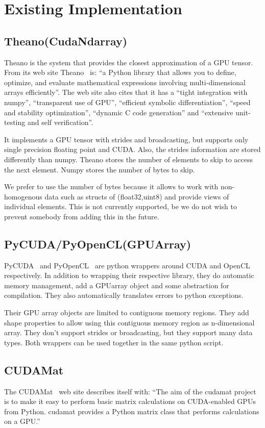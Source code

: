 \documentclass{article} %
\begin{document}
\section{Existing Implementation}
\subsection{Theano(CudaNdarray)}
Theano is the system that provides the closest approximation of a GPU tensor. From its web site Theano~\citep{bergstra+al:2010-scipy} is:
``a Python library that allows you to define, optimize, and evaluate mathematical expressions involving multi-dimensional arrays efficiently''. The web site also cites that it has a ``tight integration with numpy'', ``transparent use of GPU'', ``efficient symbolic differentiation'', ``speed and stability optimization'', ``dynamic C code generation'' and ``extensive unit-testing and self verification''.

It implements a GPU tensor with strides and broadcasting, but supports only single precision floating point and CUDA. Also, the strides information are stored differently than numpy. Theano stores the number of elements to skip to access the next element. Numpy stores the number of bytes to skip.

We prefer to use the number of bytes because it allows to work with non-homogenous data such as structs of (float32,uint8) and provide views of individual elements.  This is not currently supported, be we do not wish to prevent somebody from adding this in the future.

\subsection{PyCUDA/PyOpenCL(GPUArray)}
PyCUDA~\citep{kloeckner_pycuda_2009} and PyOpenCL~\citep{kloeckner_pycuda_2009} are python wrappers around CUDA and OpenCL respectively. In addition to wrapping their respective library, they do automatic memory management, add a GPUarray object and some abstraction for compilation. They also automatically translates errors to python exceptions.

Their GPU array objects are limited to contiguous memory regions. They add shape properties to allow using this contiguous memory region as n-dimensional array. They don't support strides or broadcasting, but they support many data types. Both wrappers can be used together in the same python script.

\subsection{CUDAMat}
The CUDAMat~\citep{cudamat-TR2009} web site describes itself with: ``The aim of the cudamat project is to make it easy to perform basic matrix calculations on CUDA-enabled GPUs from Python. cudamat provides a Python matrix class that performs calculations on a GPU.''
\end{document}
